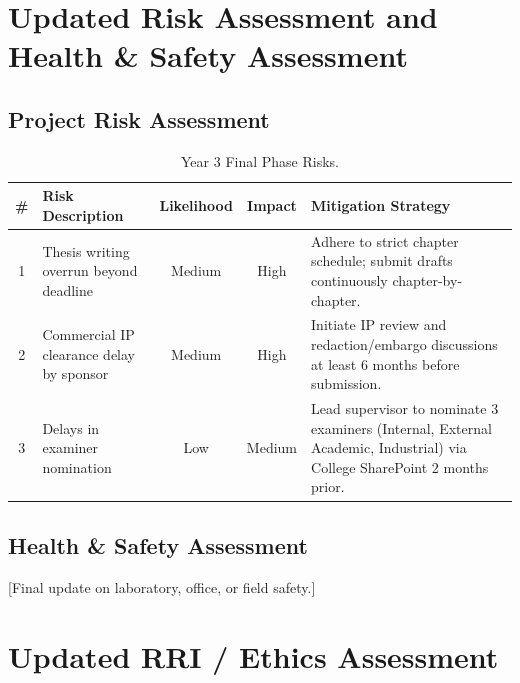 \documentclass[year3]{../idcore-ar}
\begin{document}
\section{Updated Risk Assessment and Health \& Safety Assessment}

\subsection{Project Risk Assessment}

\begin{table}[htbp]
\centering
\small
\renewcommand{\arraystretch}{1.3}
\begin{tabularx}{\linewidth}{|c|>{\raggedright\arraybackslash}p{4.5cm}|c|c|>{\raggedright\arraybackslash}X|}
  \hline
  \rowcolor{idcorelight}
  \textbf{\#} & \textbf{Risk Description} & \textbf{Likelihood} & \textbf{Impact} & \textbf{Mitigation Strategy} \\ \hline
  1 & Thesis writing overrun beyond deadline & Medium & High & Adhere to strict chapter schedule; submit drafts continuously chapter-by-chapter. \\ \hline
  2 & Commercial IP clearance delay by sponsor & Medium & High & Initiate IP review and redaction/embargo discussions at least 6 months before submission. \\ \hline
  3 & Delays in examiner nomination & Low & Medium & Lead supervisor to nominate 3 examiners (Internal, External Academic, Industrial) via College SharePoint 2 months prior. \\ \hline
\end{tabularx}
\caption{Year 3 Final Phase Risks.}
\end{table}

\subsection{Health \& Safety Assessment}

[Final update on laboratory, office, or field safety.]


\newpage
\section{Updated RRI / Ethics Assessment}
\end{document}
